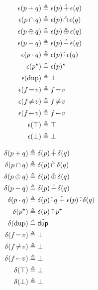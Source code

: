 \documentclass[acmsmall,dvipsnames,nonacm]{acmart}
\begin{document}
\begin{minipage}{0.5\textwidth}
    \begin{align*}
        \epsilon(p + q) &\triangleq \epsilon(p) \mathop{\nf{+}} \epsilon(q) \\
        \epsilon(p \cap q) &\triangleq \epsilon(p) \mathop{\nf{\cap}} \epsilon(q) \\
        \epsilon(p \oplus q) &\triangleq \epsilon(p) \mathop{\nf{\oplus}} \epsilon(q) \\
        \epsilon(p - q) &\triangleq \epsilon(p) \mathop{\nf{-}} \epsilon(q) \\
        \epsilon(p \cdot q) &\triangleq \epsilon(p) \mathop{\nf{\cdot}} \epsilon(q) \\
        \epsilon(p^\star) &\triangleq \epsilon(p)^\star \\
        \epsilon(\text{dup}) &\triangleq \bot\\
        \epsilon(f \test v) &\triangleq f \test v\\
        \epsilon(f \testNE v) &\triangleq f \testNE v\\
        \epsilon(f \mut v) &\triangleq f \mut v\\
        \epsilon(\top) &\triangleq \top\\
        \epsilon(\bot) &\triangleq \bot
    \end{align*}
\end{minipage}
\begin{minipage}{0.5\textwidth}
\begin{align*}
    \delta(p + q) &\triangleq \delta(p) \mathop{\tilde{+}} \delta(q) \\
    \delta(p \cap q) &\triangleq \delta(p) \mathop{\tilde{\cap}} \delta(q) \\
    \delta(p \oplus q) &\triangleq \delta(p) \mathop{\tilde{\oplus}} \delta(q) \\
    \delta(p - q) &\triangleq \delta(p) \mathop{\tilde{-}} \delta(q) \\
    \delta(p \cdot q) &\triangleq
        \delta(p) \mathop{\tilde{\cdot}} q \mathrel{\tilde{+}}
        \epsilon(p) \mathop{\tilde{\cdot}} \delta(q) \\
    \delta(p^\star) &\triangleq \delta(p) \mathrel{\tilde{\cdot}} p^\star \\
    \delta(\text{dup}) &\triangleq \tilde{\mathsf{dup}}\\
    \delta(f \mathrel{\!=\!} v) &\triangleq \bot\\
    \delta(f \mathrel{\!\neq\!} v) &\triangleq \bot\\
    \delta(f \mathrel{\!\shortleftarrow\!} v) &\triangleq \bot\\
    \delta(\top) &\triangleq \bot\\
    \delta(\bot) &\triangleq \bot
\end{align*}
\end{minipage}
\medskip
\end{document}
